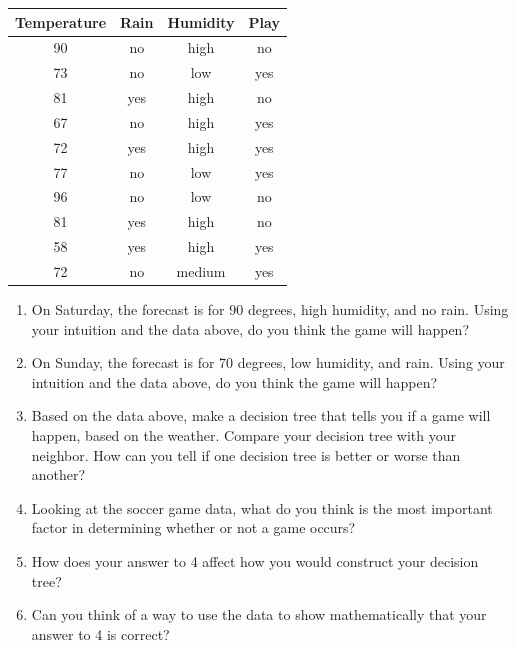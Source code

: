 \documentclass[10pt]{article}
\begin{document}
\begin{center}

\begin{tabular}{|c|c|c|c|}
\hline
Temperature &
Rain &
Humidity &
Play \\
\hline
90 &
no &
high &
no \\
73&
no&
low&
yes \\
81&
yes&
high&
no \\
67&
no&
high&
yes\\
72&
yes&
high&
yes\\
77&
no&
low&
yes\\
96 &
no&
low&
no\\
81&
yes&
high&
no\\
58&
yes&
high&
yes\\
72&
no&
medium&
yes\\
\hline
\end{tabular}
\end{center}

\begin{enumerate}
\item On Saturday, the forecast is for 90 degrees, high humidity, and no rain. Using your intuition and the data above, do you think the game will happen? 
\vspace{1cm}
\item On Sunday, the forecast is for 70 degrees, low humidity, and rain. Using your intuition and the data above, do you think the game will happen?
\vspace{1cm}
\item Based on the data above, make a decision tree that tells you if a game will happen, based on the weather.
\vfill
Compare your decision tree with your neighbor. How can you tell if one decision tree is better or worse than another?

\pagebreak

\item Looking at the soccer game data, what do you think is the most important factor in determining whether or not a game occurs?
\vspace{1cm}

\item How does your answer to 4 affect how you would construct your decision tree?
\vfill

\item Can you think of a way to use the data to show mathematically that your answer to 4 is correct?
\vfill



\end{enumerate}
\end{document}
